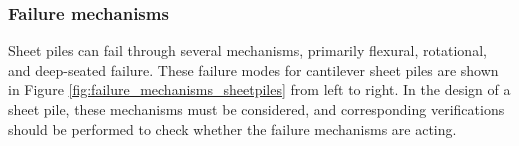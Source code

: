



\subsubsection{Failure mechanisms}

Sheet piles can fail through several mechanisms, primarily flexural, rotational, and deep-seated failure. These failure modes for cantilever sheet piles are shown in Figure \ref{fig:failure_mechanisms_sheetpiles} from left to right. In the design of a sheet pile, these mechanisms must be considered, and corresponding verifications should be performed to check whether the failure mechanisms are acting.

